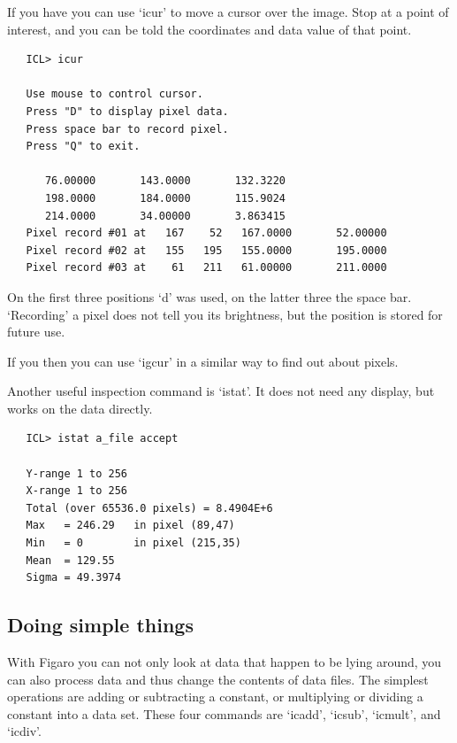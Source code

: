   If you have
   {}
   you can use `icur' to move a cursor over the image. Stop at a point
   of interest, and you can be told the coordinates and data value of
   that point.

\begin{verbatim}
   ICL> icur

   Use mouse to control cursor.
   Press "D" to display pixel data.
   Press space bar to record pixel.
   Press "Q" to exit.

      76.00000       143.0000       132.3220
      198.0000       184.0000       115.9024
      214.0000       34.00000       3.863415
   Pixel record #01 at   167    52   167.0000       52.00000
   Pixel record #02 at   155   195   155.0000       195.0000
   Pixel record #03 at    61   211   61.00000       211.0000
\end{verbatim}

   On the first three positions `d' was used, on the latter three the
   space bar. `Recording' a pixel does not tell you its brightness, but
   the position is stored for future use.

   If you
   {}
   then you can use `igcur' in a similar way to find out about pixels.

   Another useful inspection command is `istat'. It does not need any
   display, but works on the data directly.

\begin{verbatim}
   ICL> istat a_file accept

   Y-range 1 to 256
   X-range 1 to 256
   Total (over 65536.0 pixels) = 8.4904E+6
   Max   = 246.29   in pixel (89,47)
   Min   = 0        in pixel (215,35)
   Mean  = 129.55
   Sigma = 49.3974
\end{verbatim}


\subsection{\label{arithm}Doing simple things}

   With Figaro you can not only look at data that happen to be lying
   around, you can also process data and thus change the contents of
   data files. The simplest operations are adding or subtracting a
   constant, or multiplying or dividing a constant into a data set.
   These four commands are `icadd', `icsub', `icmult', and
   `icdiv'.


